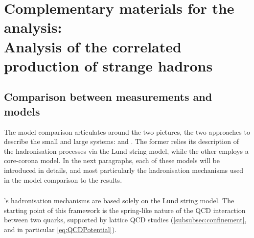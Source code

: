 \chapter{Complementary materials for the analysis:\\Analysis of the correlated production of strange hadrons}
\label{appendix:CorrelatedAnalysis}

\section{Comparison between measurements and models}

The model comparison articulates around the two pictures, the two approaches to describe the small and large systems: \Pythia and \Epos. The former relies its description of the hadronisation processes via the Lund string model, while the other employs a core-corona model. In the next paragraphs, each of these models will be introduced in details, and most particularly the hadronisation mechanisms used in the model comparison to the results.

\subsection{\Pythia}

\Pythia's hadronisation mechanisms are based solely on the Lund string model. The starting point of this framework is the spring-like nature of the QCD interaction between two quarks, supported by lattice QCD studies (\Sec\ref{subsubsec:confinement}, and in particular \eq\ref{eq:QCDPotential}). 

